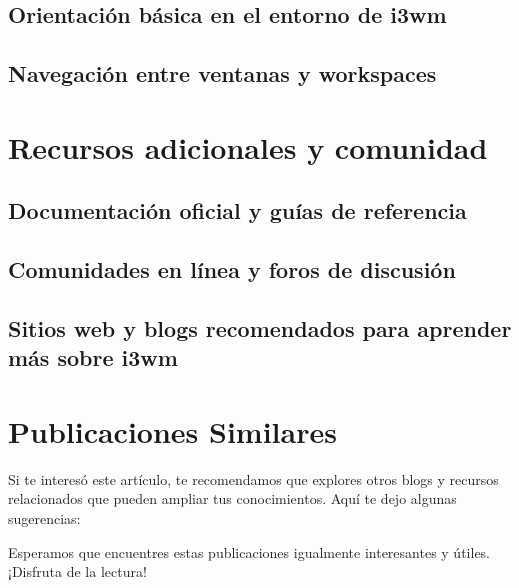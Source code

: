 \documentclass[
  jou,
  floatsintext,
  longtable,
  a4paper,
  nolmodern,
  notxfonts,
  notimes,
  12pt,
  colorlinks=true,linkcolor=blue,citecolor=blue,urlcolor=blue]{apa7}
\begin{document}
\subsection{Orientación básica en el entorno de
i3wm}\label{orientaciuxf3n-buxe1sica-en-el-entorno-de-i3wm}

\subsection{Navegación entre ventanas y
workspaces}\label{navegaciuxf3n-entre-ventanas-y-workspaces}

\section{Recursos adicionales y
comunidad}\label{recursos-adicionales-y-comunidad}

\subsection{Documentación oficial y guías de
referencia}\label{documentaciuxf3n-oficial-y-guuxedas-de-referencia}

\subsection{Comunidades en línea y foros de
discusión}\label{comunidades-en-luxednea-y-foros-de-discusiuxf3n}

\subsection{Sitios web y blogs recomendados para aprender más sobre
i3wm}\label{sitios-web-y-blogs-recomendados-para-aprender-muxe1s-sobre-i3wm}

\section{Publicaciones Similares}\label{publicaciones-similares}

Si te interesó este artículo, te recomendamos que explores otros blogs y
recursos relacionados que pueden ampliar tus conocimientos. Aquí te dejo
algunas sugerencias:

Esperamos que encuentres estas publicaciones igualmente interesantes y
útiles. ¡Disfruta de la lectura!
\end{document}
